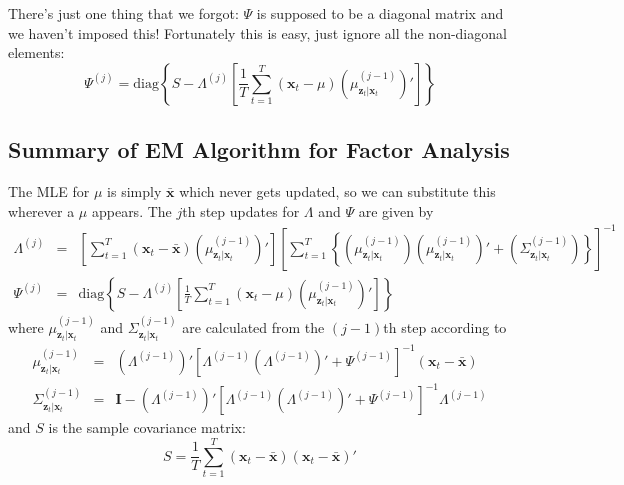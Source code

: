 \documentclass[12pt]{article}
\theoremstyle{definition}
\begin{document}
There's just one thing that we forgot: $\Psi$ is supposed to be a diagonal matrix and we haven't imposed this! Fortunately this is easy, just ignore all the non-diagonal elements:
$$\Psi^{(j)} = \mbox{diag}\left\{S - \Lambda^{(j)}\left[\frac{1}{T} \sum_{t=1}^T (\mathbf{x}_t - \mu)\left(\mu^{(j-1)}_{\mathbf{z}_t|\mathbf{x}_t}\right)'\right] \right\}$$

\subsection{Summary of EM Algorithm for Factor Analysis}
The MLE for $\mu$ is simply $\bar{\mathbf{x}}$ which never gets updated, so we can substitute this wherever a $\mu$ appears. The $j$th step updates for $\Lambda$ and $\Psi$ are given by
\begin{eqnarray*}
	\Lambda^{(j)} &=& \left[\sum_{t=1}^T (\mathbf{x}_t - \bar{\mathbf{x}})\left(\mu^{(j-1)}_{\mathbf{z}_t|\mathbf{x}_t} \right)'\right]\left[\sum_{t=1}^T \left\{ \left(\mu^{(j-1)}_{\mathbf{z}_t|\mathbf{x}_t} \right)\left(\mu^{(j-1)}_{\mathbf{z}_t|\mathbf{x}_t} \right)' + \left(\Sigma^{(j-1)}_{\mathbf{z}_t|\mathbf{x}_t} \right) \right\}  \right]^{-1} \\
	\Psi^{(j)} &=& \mbox{diag}\left\{S - \Lambda^{(j)}\left[\frac{1}{T} \sum_{t=1}^T (\mathbf{x}_t - \mu)\left(\mu^{(j-1)}_{\mathbf{z}_t|\mathbf{x}_t}\right)'\right] \right\}
\end{eqnarray*}
where $\mu^{(j-1)}_{\mathbf{z}_t|\mathbf{x}_t}$ and $\Sigma^{(j-1)}_{\mathbf{z}_t|\mathbf{x}_t}$ are calculated from the $(j-1)$th step according to
	\begin{eqnarray*}
		\mu^{(j-1)}_{\mathbf{z}_t|\mathbf{x}_t} &=& \left(\Lambda^{(j-1)}\right)' \left[\Lambda^{(j-1)} \left(\Lambda^{(j-1)}\right)' + \Psi^{(j-1)}\right]^{-1} \left(\mathbf{x}_t - \bar{\mathbf{x}}\right) \\
		\Sigma^{(j-1)}_{\mathbf{z}_t|\mathbf{x}_t}  &=& \mathbf{I} - \left(\Lambda^{(j-1)}\right)' \left[\Lambda^{(j-1)} \left(\Lambda^{(j-1)}\right)' + \Psi^{(j-1)}\right]^{-1}\Lambda^{(j-1)}
	\end{eqnarray*}
and $S$ is the sample covariance matrix:
	$$S = \frac{1}{T} \sum_{t=1}^T (\mathbf{x}_t - \bar{\mathbf{x}})(\mathbf{x}_t - \bar{\mathbf{x}})'$$
\end{document}
